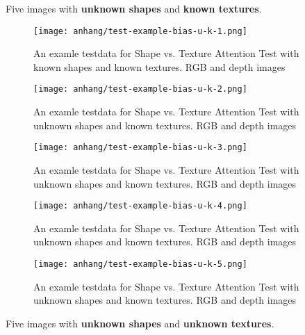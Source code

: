 	Five images with \textbf{unknown shapes} and \textbf{known textures}.
	
	\begin{figure}[H]
		\centering
		\texttt{[image: anhang/test-example-bias-u-k-1.png]}
		\caption[An examle testdata for Shape vs. Texture Attention Test with known shapes and known textures. RGB and depth images]{An examle testdata for Shape vs. Texture Attention Test with known shapes and known textures. RGB and depth images}
	\end{figure}
	\begin{figure}[H]
		\centering
		\texttt{[image: anhang/test-example-bias-u-k-2.png]}
		\caption[An examle testdata for Shape vs. Texture Attention Test with unknown shapes and known textures. RGB and depth images]{An examle testdata for Shape vs. Texture Attention Test with unknown shapes and known textures. RGB and depth images}
	\end{figure}
	\begin{figure}[H]
		\centering
		\texttt{[image: anhang/test-example-bias-u-k-3.png]}
		\caption[An examle testdata for Shape vs. Texture Attention Test with unknown shapes and known textures. RGB and depth images]{An examle testdata for Shape vs. Texture Attention Test with unknown shapes and known textures. RGB and depth images}
	\end{figure}
	\begin{figure}[H]
		\centering
		\texttt{[image: anhang/test-example-bias-u-k-4.png]}
		\caption[An examle testdata for Shape vs. Texture Attention Test with unknown shapes and known textures. RGB and depth images]{An examle testdata for Shape vs. Texture Attention Test with unknown shapes and known textures. RGB and depth images}
	\end{figure}
	\begin{figure}[H]
		\centering
		\texttt{[image: anhang/test-example-bias-u-k-5.png]}
		\caption[An examle testdata for Shape vs. Texture Attention Test with unknown shapes and known textures. RGB and depth images]{An examle testdata for Shape vs. Texture Attention Test with unknown shapes and known textures. RGB and depth images}
	\end{figure}
	
	\FloatBarrier
	
	Five images with \textbf{unknown shapes} and \textbf{unknown textures}.
	
